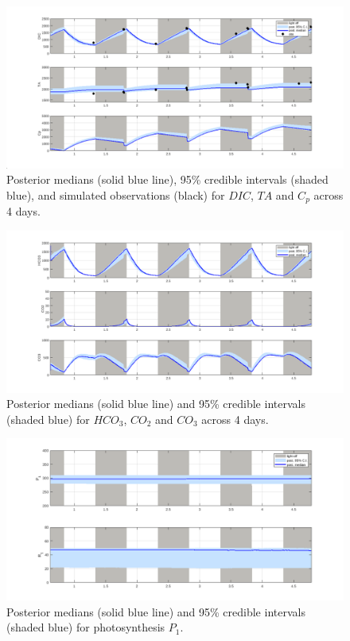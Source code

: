 \documentclass{ruthesis}
\begin{document}
\begin{figure}
	\centerline{\includegraphics[width=1.2\textwidth]{images_microalgae/plots_test/DIC_TA_Cp}}
	\caption[.]{Posterior medians (solid blue line), 95\% credible intervals (shaded blue), and simulated observations (black) for $DIC$, $TA$ and $C_p$ across 4 days.}
	\label{fig:micro_exp_test_DIC_TA_Cp}
\end{figure}

\begin{figure}
	\centerline{\includegraphics[width=1.2\textwidth]{images_microalgae/plots_test/carbon}}
	\caption[.]{Posterior medians (solid blue line) and 95\% credible intervals (shaded blue) for $HCO_3$, $CO_2$ and $CO_3$ across 4 days.}
	\label{fig:micro_exp_test_carbon}
\end{figure}

\begin{figure}
	\centerline{\includegraphics[width=1.2\textwidth]{images_microalgae/plots_test/P_and_R}}
	\caption[.]{Posterior medians (solid blue line) and 95\% credible intervals (shaded blue) for photosynthesis $P_1$.}
	\label{fig:micro_exp_test_P}
\end{figure}
\end{document}
